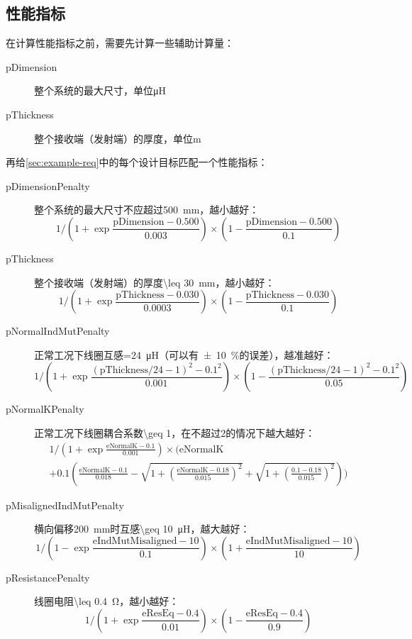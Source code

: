 \documentclass[index]{subfiles}
\begin{document}
\subsection{性能指标}
在计算性能指标之前，需要先计算一些辅助计算量：
\begin{description}
  \item[pDimension] 整个系统的最大尺寸，单位\si{\micro\henry}
  \item[pThickness] 整个接收端（发射端）的厚度，单位\si{\metre}
\end{description}
再给\cref{sec:example-req}中的每个设计目标匹配一个性能指标：
\begin{description}
  \item[pDimensionPenalty] 整个系统的最大尺寸不应超过\SI{500}{\milli\metre}，越小越好：
  \[1{\Big/}\!\left(1+\exp \frac{\text{pDimension}-0.500}{0.003}\right)\times\left(1 - \frac{\text{pDimension}-0.500}{0.1}\right)\]
  \item[pThickness] 整个接收端（发射端）的厚度\SI{\leq 30}{\milli\metre}，越小越好：
  \[1{\Big/}\!\left(1+\exp \frac{\text{pThickness}-0.030}{0.0003}\right)\times\left(1 - \frac{\text{pThickness}-0.030}{0.1}\right)\]
  \item[pNormalIndMutPenalty] 正常工况下线圈互感\SI{=24}{\micro\henry}（可以有\SI{\pm 10}{\percent}的误差），越准越好：
  \[1{\Big/}\!\left(1+\exp \frac{(\text{pThickness}/24-1)^2-0.1^2}{0.001}\right)\times\left(1 - \frac{(\text{pThickness}/24-1)^2-0.1^2}{0.05}\right)\]
  \item[pNormalKPenalty] 正常工况下线圈耦合系数\num{\geq 1}，在不超过2的情况下越大越好：
  \[
  \begin{multlined}
  1{\Big/}\!\left(1+\exp \frac{\text{eNormalK}-0.1}{0.001}\right)\times{\Bigg(}\text{eNormalK} \\
  + 0.1\left(\frac{\text{eNormalK}-0.1}{0.018} - \sqrt{1+\left(\scriptstyle\frac{\text{eNormalK}-0.18}{0.015}\right)^2}
  + \sqrt{1+\left(\scriptstyle\frac{0.1-0.18}{0.015}\right)^2}\right){\Bigg)}
  \end{multlined}
  \]
  \item[pMisalignedIndMutPenalty] 横向偏移\SI{200}{\milli\metre}时互感\SI{\geq 10}{\micro\henry}，越大越好：
  \[1{\Big/}\!\left(1-\exp \frac{\text{eIndMutMisaligned}-10}{0.1}\right)\times\left(1 + \frac{\text{eIndMutMisaligned}-10}{10}\right)\]
  \item[pResistancePenalty] 线圈电阻\SI{\leq 0.4}{\ohm}，越小越好：
  \[1{\Big/}\!\left(1+\exp \frac{\text{eResEq}-0.4}{0.01}\right)\times\left(1 - \frac{\text{eResEq}-0.4}{0.9}\right)\]
\end{description}
\end{document}
